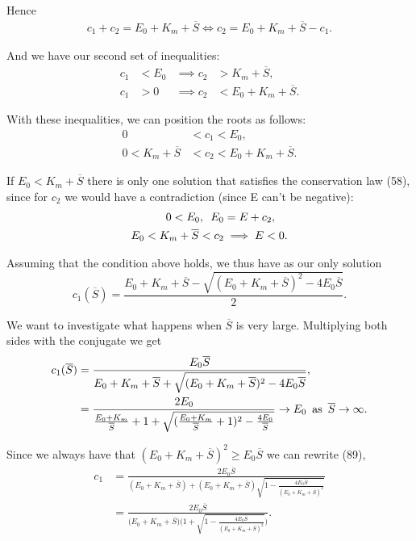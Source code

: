 \documentclass[12pt]{article}
\begin{document}
Hence
\begin{align}
  c_1 + c_2 = E_0 + K_m + \overline{S} \iff c_2 = E_0 + K_m + \overline{S} - c_1.
\end{align}

And we have our second set of inequalities:
\begin{align}
  c_1 &< E_0 &\implies c_2 &> K_m + \overline{S}, \\
  c_1 &> 0 &\implies c_2 &< E_0 + K_m + \overline{S}.
\end{align}

With these inequalities, we can position the roots as follows:
\begin{align}
  0 &< c_1 < E_0, \\
  0 < K_m + \overline{S} &< c_2 < E_0 + K_m + \overline{S}.
\end{align}

If $E_0 < K_m + \overline{S}$ there is only one solution that
satisfies the conservation law (58), since for $c_2$ we would have a
contradiction (since E can't be negative):
\begin{align}
  0 < E_0, \enskip E_0 &= E + c_2, \\
  E_0 < K_m + \overline{S} < c_2 &\implies E < 0.
\end{align}

Assuming that the condition above holds, we thus have as our only solution
\begin{equation}
  c_1(\overline{S}) = \frac{E_0 + K_m + \overline{S} - \sqrt{(E_0 +
      K_m + \overline{S})^2 - 4 E_0 \overline{S}}}{2}.
\end{equation}

We want to investigate what happens when $\overline{S}$ is very
large. Multiplying both sides with the conjugate we get
\begin{align}
  c_1(\overline{S}) &= \frac{E_0 \overline{S}}{E_0 + K_m + \overline{S} +
    \sqrt{(E_0 +K_m + \overline{S})^2 - 4 E_0 \overline{S}}}, \\
                    &= \frac{2 E_0}{\frac{E_0 + K_m}{\overline{S}} + 1 +
    \sqrt{(\frac{E_0 + K_m}{\overline{S}} + 1)^2 - \frac{4 E_0}{\overline{S}}}}
  \to  E_0 \enskip \text{as} \enskip \overline{S} \to \infty.
\end{align}

Since we always have that
$(E_0 + K_m + \overline{S})^2 \geq E_0 \overline{S}$ we can rewrite (89),
\begin{align}
  c_1 &= \frac{2 E_0 \overline{S}}
              {(E_0 + K_m + \overline{S}) + (E_0 + K_m + \overline{S})
              \sqrt{1- \frac{4 E_0 \overline{S}}
                            {(E_0 + K_m + \overline{S})^2}}} \\
      &= \frac{2 E_0 \overline{S}}
              {\Big(E_0 + K_m + \overline{S}\Big)
              \Big(1 + \sqrt{1- \frac{4 E_0 \overline{S}}
                  {(E_0 + K_m + \overline{S})^2}}\Big)}.
\end{align}
\end{document}
